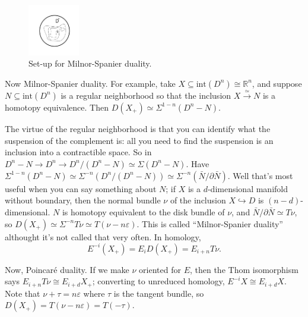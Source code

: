 \documentclass{article}
\newcommand{\R}{\mathbb{R}}
\newcommand{\pt}[1]{#1_+}
\newcommand{\Suspend}{\Sigma}
\newcommand{\into}{\hookrightarrow}
\begin{document}
\begin{figure}
\centering\includegraphics[width=0.2\textwidth]{figures/26.pdf}
\caption{\small Set-up for Milnor-Spanier duality.}
\end{figure}
Now Milnor-Spanier duality.  For example, take $X \subseteq \mathrm{int}(D^n) \cong \R^n$, and suppose $N \subseteq \mathrm{int}(D^n)$ is a regular neighborhood so that the inclusion $X \stackrel{\simeq}{\to} N$ is a homotopy equivalence.  Then $D(\pt{X}) \simeq \Suspend^{1-n}(D^n - N)$.

The virtue of the regular neighborhood is that you can identify what the suspension of the complement is: all you need to find the suspension is an inclusion into a contractible space.  So in $D^n - N \to D^n \to D^n/(D^n - N) \simeq \Suspend(D^n - N)$.  Have $\Suspend^{1-n}(D^n - N) \simeq \Suspend^{-n}(D^n / (D^n-N)) \simeq \Suspend^{-n}(\bar N / \partial \bar N)$.  Well that's most useful when you can say something about $N$; if $X$ is a $d$-dimensional manifold without boundary, then the normal bundle $\nu$ of the inclusion $X \into D$ is $(n-d)$-dimensional.  $N$ is homotopy equivalent to the disk bundle of $\nu$, and $\bar N / \partial \bar N \simeq T \nu$, so $D(\pt{X}) \simeq \Suspend^{-n} T\nu \simeq T(\nu - n \varepsilon)$.  This is called ``Milnor-Spanier duality'' althought it's not called that very often.  In homology,
\[
E^{-i}(\pt{X}) = E_i D(\pt{X}) = E_{i+n} T \nu.
\]

Now, Poincar\'e duality.  If we make $\nu$ oriented for $E$, then the Thom isomorphism says $E_{i+n} T \nu \cong E_{i+d} \pt{X}$; converting to unreduced homology, $E^{-i} X \cong E_{i+d} X$.  Note that $\nu + \tau = n \varepsilon$ where $\tau$ is the tangent bundle, so $D(\pt{X}) = T(\nu - n \varepsilon) = T(-\tau)$.
\end{document}
